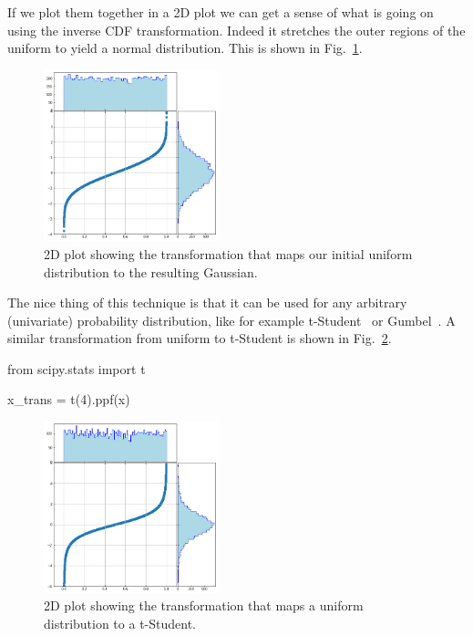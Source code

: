 If we plot them together in a 2D plot we can get a sense of what is going on using the inverse CDF transformation. Indeed it stretches the outer regions of the uniform to yield a normal distribution. This is shown in Fig.~\ref{fig:uniform_to_gauss}. 
    
\begin{figure}[htbp]
  \centering
  \includegraphics[width=0.45\textwidth]{figures/uniform_to_gauss}
  \caption{2D plot showing the transformation that maps our initial uniform distribution to the resulting Gaussian.}
  \label{fig:uniform_to_gauss}
\end{figure}
    
The nice thing of this technique is that it can be used for any arbitrary (univariate) probability distribution, like for example t-Student~\cite{bib:t_student} or Gumbel~\cite{bib:gumbel}. A similar transformation from uniform to t-Student is shown in Fig.~\ref{fig:uniform_to_tstudent}.

\begin{ipython}
from scipy.stats import t

x_trans = t(4).ppf(x)
\end{ipython}

\begin{figure}[htbp]
  \centering
  \includegraphics[width=0.45\textwidth]{figures/tstudent_to_uniform}
  \caption{2D plot showing the transformation that maps a uniform distribution to a t-Student.}
  \label{fig:uniform_to_tstudent}
\end{figure}

